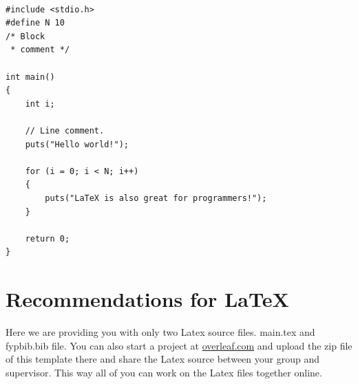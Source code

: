\begin{lstlisting}

#include <stdio.h>
#define N 10
/* Block
 * comment */

int main()
{
    int i;

    // Line comment.
    puts("Hello world!");
    
    for (i = 0; i < N; i++)
    {
        puts("LaTeX is also great for programmers!");
    }

    return 0;
}
\end{lstlisting}

\section{Recommendations for \LaTeX}
Here we are providing you with only two Latex source files.  main.tex and fypbib.bib file. You can also start a project at \url{overleaf.com} and upload the zip file of this template there and share the Latex source between your group and supervisor.  This way all of you can work on the Latex files together online.


